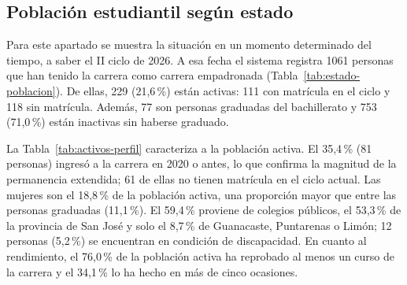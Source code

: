 \subsection{Población estudiantil según estado}

Para este apartado se muestra la situación en un momento determinado del tiempo, a saber el II ciclo de 2026. A esa fecha el sistema registra 1061 personas que han tenido la carrera como carrera empadronada (Tabla~\ref{tab:estado-poblacion}). De ellas, 229 (21,6\,\%) están activas: 111 con matrícula en el ciclo y 118 sin matrícula. Además, 77 son personas graduadas del bachillerato y 753 (71,0\,\%) están inactivas sin haberse graduado.

La Tabla~\ref{tab:activos-perfil} caracteriza a la población activa. El 35,4\,\% (81 personas) ingresó a la carrera en 2020 o antes, lo que confirma la magnitud de la permanencia extendida; 61 de ellas no tienen matrícula en el ciclo actual. Las mujeres son el 18,8\,\% de la población activa, una proporción mayor que entre las personas graduadas (11,1\,\%). El 59,4\,\% proviene de colegios públicos, el 53,3\,\% de la provincia de San José y solo el 8,7\,\% de Guanacaste, Puntarenas o Limón; 12 personas (5,2\,\%) se encuentran en condición de discapacidad. En cuanto al rendimiento, el 76,0\,\% de la población activa ha reprobado al menos un curso de la carrera y el 34,1\,\% lo ha hecho en más de cinco ocasiones.

